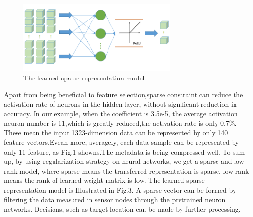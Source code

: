 
\begin{figure}
\includegraphics[width=8cm]{figure/sparse_represention_model}
\caption{The learned sparse representation model.}
\end{figure}

Apart from being beneficial to feature selection,sparse constraint can reduce the activation rate of neurons in the hidden layer, without significant reduction in accuracy. In our example, when the coefficient is 3.5e-5, the average activation neuron number is 11,which is greatly reduced,the activation rate is only 0.7{\%}.
These mean the input 1323-dimension data can be represented by only 140 feature vectors.Evean more, averagely, each data sample can be represented by only 11 feature, as Fig.1 showns.The metadata is being compressed well. To sum up, by using regularization strategy on neural networks, we get a sparse and low rank model, where sparse means the transferred representation is sparse, low rank means the rank of learned weight matrix is low. The learned sparse representation model is Illustrated in Fig.3. 
A sparse vector can be formed by filtering the data measured in sensor nodes through the pretrained neuron networks. Decisions, such as target location can be made by further processing.

